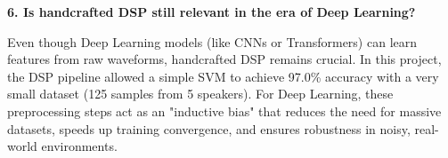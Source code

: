\textbf{6. Is handcrafted DSP still relevant in the era of Deep Learning?}

Even though Deep Learning models (like CNNs or Transformers) can learn features from raw waveforms, handcrafted DSP remains crucial. In this project, the DSP pipeline allowed a simple SVM to achieve 97.0\% accuracy with a very small dataset (125 samples from 5 speakers). For Deep Learning, these preprocessing steps act as an "inductive bias" that reduces the need for massive datasets, speeds up training convergence, and ensures robustness in noisy, real-world environments.

